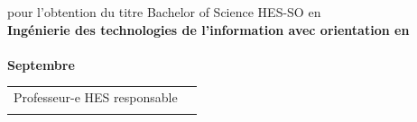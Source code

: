 \begin{titlepage}
\begin{center}
{{				%
				{\large pour l’obtention du titre Bachelor of Science HES-SO en\\[10pt]
				
				 \fontsize{14pt}{20pt} \textbf{Ingénierie des technologies de l’information avec orientation en\\ \Orientation }\\[32pt]
				
				\textbf{Septembre \Year}}\\[49pt]
				
				{
					\begin{tabular*}{16cm}{>{\centering}m{7.59cm}>{\centering}m{7.58cm}}
						Professeur-e HES responsable\\[13pt]
						\textbf{ \Professor }
					\end{tabular*}
				}
			}
			\vfill
		}%
	\end{center}
\end{titlepage}
\addtocounter{page}{1}
